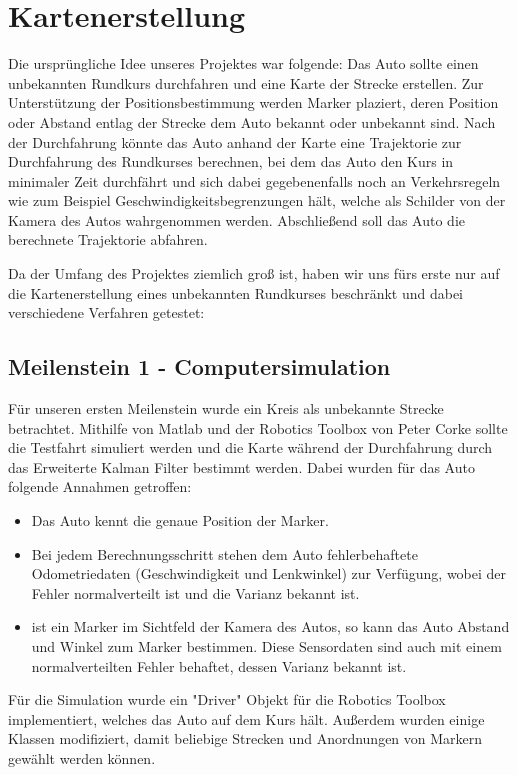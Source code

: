 \section{Kartenerstellung}

Die ursprüngliche Idee unseres Projektes war folgende: Das Auto sollte einen unbekannten Rundkurs durchfahren und eine Karte der Strecke erstellen. Zur Unterstützung der Positionsbestimmung werden Marker plaziert, deren Position oder Abstand entlag der Strecke dem Auto bekannt oder unbekannt sind.
Nach der Durchfahrung könnte das Auto anhand der Karte eine Trajektorie zur Durchfahrung des Rundkurses berechnen, bei dem das Auto den Kurs in minimaler Zeit durchfährt und sich dabei gegebenenfalls noch an Verkehrsregeln wie zum Beispiel Geschwindigkeitsbegrenzungen hält, welche als Schilder von der Kamera des Autos wahrgenommen werden.
Abschließend soll das Auto die berechnete Trajektorie abfahren.

Da der Umfang des Projektes ziemlich groß ist, haben wir uns fürs erste nur auf die Kartenerstellung eines unbekannten Rundkurses beschränkt und dabei verschiedene Verfahren getestet:

\subsection{Meilenstein 1 - Computersimulation}

Für unseren ersten Meilenstein wurde ein Kreis als unbekannte Strecke betrachtet. Mithilfe von Matlab und der Robotics Toolbox von Peter Corke sollte die Testfahrt simuliert werden und die Karte während der Durchfahrung durch das Erweiterte Kalman Filter bestimmt werden.
Dabei wurden für das Auto folgende Annahmen getroffen:
\begin{itemize}
 	\item Das Auto kennt die genaue Position der Marker.
 	\item Bei jedem Berechnungsschritt stehen dem Auto fehlerbehaftete Odometriedaten (Geschwindigkeit und Lenkwinkel) zur Verfügung, wobei der Fehler normalverteilt ist und die Varianz bekannt ist.
 	\item ist ein Marker im Sichtfeld der Kamera des Autos, so kann das Auto Abstand und Winkel zum Marker bestimmen. Diese Sensordaten sind auch mit einem normalverteilten Fehler behaftet, dessen Varianz bekannt ist.
\end{itemize}

Für die Simulation wurde ein "{}Driver"{} Objekt für die Robotics Toolbox implementiert, welches das Auto auf dem Kurs hält. Außerdem wurden einige Klassen modifiziert, damit beliebige Strecken und Anordnungen von Markern gewählt werden können.


